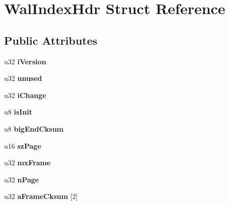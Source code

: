 \hypertarget{struct_wal_index_hdr}{\section{Wal\-Index\-Hdr Struct Reference}
\label{struct_wal_index_hdr}
}
\subsection*{Public Attributes}
\begin{DoxyCompactItemize}
\item 
\hypertarget{struct_wal_index_hdr_a49295f5eb9d6f37a1498cf1a66410b92}{u32 {\bfseries i\-Version}}\label{struct_wal_index_hdr_a49295f5eb9d6f37a1498cf1a66410b92}

\item 
\hypertarget{struct_wal_index_hdr_aa00596b4ad38dce7f97261a49ce64d74}{u32 {\bfseries unused}}\label{struct_wal_index_hdr_aa00596b4ad38dce7f97261a49ce64d74}

\item 
\hypertarget{struct_wal_index_hdr_a9fafc4d4af9ab741b3b8733380a7927f}{u32 {\bfseries i\-Change}}\label{struct_wal_index_hdr_a9fafc4d4af9ab741b3b8733380a7927f}

\item 
\hypertarget{struct_wal_index_hdr_a1cc0dc2be6cd108a7bcca260be3e4cb9}{u8 {\bfseries is\-Init}}\label{struct_wal_index_hdr_a1cc0dc2be6cd108a7bcca260be3e4cb9}

\item 
\hypertarget{struct_wal_index_hdr_aa6be53a6a60ea0b2a97a245b5ca68d61}{u8 {\bfseries big\-End\-Cksum}}\label{struct_wal_index_hdr_aa6be53a6a60ea0b2a97a245b5ca68d61}

\item 
\hypertarget{struct_wal_index_hdr_a74e9182803402942cf6e45d8e23589c7}{u16 {\bfseries sz\-Page}}\label{struct_wal_index_hdr_a74e9182803402942cf6e45d8e23589c7}

\item 
\hypertarget{struct_wal_index_hdr_aa697dbe8134daf3d02dce07feb897f41}{u32 {\bfseries mx\-Frame}}\label{struct_wal_index_hdr_aa697dbe8134daf3d02dce07feb897f41}

\item 
\hypertarget{struct_wal_index_hdr_ae4ca33947cd629feb9dce2b1f976c364}{u32 {\bfseries n\-Page}}\label{struct_wal_index_hdr_ae4ca33947cd629feb9dce2b1f976c364}

\item 
\hypertarget{struct_wal_index_hdr_a425dff294e0f0b30b6819c273404c721}{u32 {\bfseries a\-Frame\-Cksum} \mbox{[}2\mbox{]}}\label{struct_wal_index_hdr_a425dff294e0f0b30b6819c273404c721}


\end{DoxyCompactItemize}
